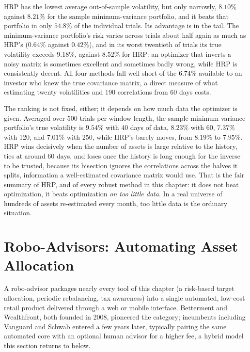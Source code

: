 \documentclass[../ai_in_finance]{subfiles}
\begin{document}
HRP has the lowest average out-of-sample volatility, but only narrowly, $8.10\%$ against $8.21\%$ for the sample minimum-variance portfolio, and it beats that portfolio in only $54.8\%$ of the individual trials. Its advantage is in the tail. The minimum-variance portfolio's risk varies across trials about half again as much as HRP's ($0.64\%$ against $0.42\%$), and in its worst twentieth of trials its true volatility exceeds $9.18\%$, against $8.52\%$ for HRP: an optimizer that inverts a noisy matrix is sometimes excellent and sometimes badly wrong, while HRP is consistently decent. All four methods fall well short of the $6.74\%$ available to an investor who knew the true covariance matrix, a direct measure of what estimating twenty volatilities and 190 correlations from 60 days costs.

The ranking is not fixed, either; it depends on how much data the optimizer is given. Averaged over 500 trials per window length, the sample minimum-variance portfolio's true volatility is $9.54\%$ with 40 days of data, $8.23\%$ with 60, $7.37\%$ with 120, and $7.01\%$ with 250, while HRP's barely moves, from $8.19\%$ to $7.95\%$. HRP wins decisively when the number of assets is large relative to the history, ties at around 60 days, and loses once the history is long enough for the inverse to be trusted, because its bisection ignores the correlations across the halves it splits, information a well-estimated covariance matrix would use. That is the fair summary of HRP, and of every robust method in this chapter: it does not beat optimization, it beats optimization \emph{on too little data}. In a real universe of hundreds of assets re-estimated every month, too little data is the ordinary situation.

\section{Robo-Advisors: Automating Asset Allocation}
\label{sec:robo-advisors}


A robo-advisor packages nearly every tool of this chapter (a risk-based target allocation, periodic rebalancing, tax awareness) into a single automated, low-cost retail product delivered through a web or mobile interface. Betterment and Wealthfront, both founded in 2008, pioneered the category; incumbents including Vanguard and Schwab entered a few years later, typically pairing the same automated core with an optional human advisor for a higher fee, a hybrid model this section returns to below.
\end{document}
